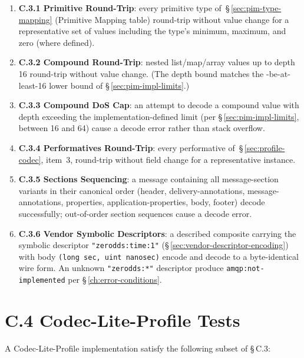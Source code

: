 \documentclass{../styles/zerodds-vendor-spec}
\begin{document}
\begin{enumerate}
  \item \textbf{C.3.1 Primitive Round-Trip}: every primitive type
        of~\S\,\ref{sec:pim-type-mapping} (Primitive Mapping
        table)  round-trip without value change for
        a representative set of values including the type's
        minimum, maximum, and zero (where defined).
  \item \textbf{C.3.2 Compound Round-Trip}: nested
        list/map/array values up to depth 16 
        round-trip without value change. (The depth bound matches
        the -be-at-least-16 lower bound of
        \S\,\ref{sec:pim-impl-limits}.)
  \item \textbf{C.3.3 Compound DoS Cap}: an attempt to decode a
        compound value with depth exceeding the
        implementation-defined limit (per
        \S\,\ref{sec:pim-impl-limits}, between 16 and 64)
         cause a decode error rather than stack
        overflow.
  \item \textbf{C.3.4 Performatives Round-Trip}: every performative
        of~\S\,\ref{sec:profile-codec}, item~3, 
        round-trip without field change for a representative
        instance.
  \item \textbf{C.3.5 Sections Sequencing}: a message containing
        all message-section variants in their canonical order
        (header, delivery-annotations, message-annotations,
        properties, application-properties, body, footer)
         decode successfully; out-of-order section
        sequences  cause a decode error.
  \item \textbf{C.3.6 Vendor Symbolic Descriptors}: a described
        composite carrying the symbolic descriptor
        \texttt{"zerodds:time:1"}
        (\S\,\ref{sec:vendor-descriptor-encoding}) with body
        \texttt{(long sec, uint nanosec)}  encode
        and decode to a byte-identical wire form. An unknown
        \texttt{"zerodds:*"} descriptor  produce
        \texttt{amqp:not-implemented} per
        \S\,\ref{ch:error-conditions}.
\end{enumerate}

\section*{C.4 Codec-Lite-Profile Tests}

A Codec-Lite-Profile implementation  satisfy the
following subset of \S\,C.3:
\end{document}
